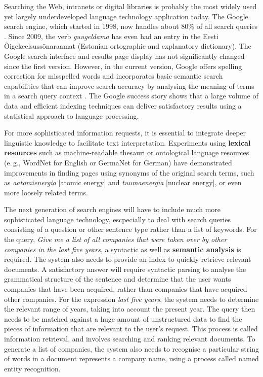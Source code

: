\begin{multicols}{2}
Searching the Web, intranets or digital libraries is probably the most widely used yet largely underdeveloped language technology application today. The Google search engine, which started in 1998, now handles about 80\% of all search queries \cite{spi1}. Since 2009, the verb \textit{guugeldama} has even had an entry in the Eesti Õigekeelsussõnaraamat (Estonian ortographic and explanatory dictionary). The Google search interface and results page display has not significantly changed since the first version. However, in the current version, Google offers spelling correction for misspelled words and incorporates basic semantic search capabilities that can improve search accuracy by analysing the meaning of terms in a search query context \cite{pc1}. The Google success story shows that a large volume of data and efficient indexing techniques can deliver satisfactory results using a statistical approach to language processing. 

For more sophisticated information requests, it is essential to integrate deeper linguistic knowledge to facilitate text interpretation. Experiments using \textbf{lexical resources} such as machine-readable thesauri or ontological language resources (e.\,g., WordNet for English or GermaNet for German) have demonstrated improvements in finding pages using synonyms of the original search terms, such as \textit{aatomienergia} {[}atomic energy{]} and \textit{tuumaenergia} {[}nuclear energy{]}, or even more loosely related terms.


The next generation of search engines will have to include much more sophisticated language technology, escpecially to deal with search queries consisting of a question or other sentence type rather than a list of keywords. For the query, \textit{Give me a list of all companies that were taken over by other companies in the last five years}, a syntactic as well as \textbf{semantic analysis} is required. The system also needs to provide an index to quickly retrieve relevant documents. A satisfactory answer will require syntactic parsing to analyse the grammatical structure of the sentence and determine that the user wants companies that have been acquired, rather than companies that have acquired other companies. For the expression \textit{last five years}, the system needs to determine the relevant range of years, taking into account the present year. The query then needs to be matched against a huge amount of unstructured data to find the pieces of information that are relevant to the user’s request. This process is called information retrieval, and involves searching and ranking relevant documents. To generate a list of companies, the system also needs to recognise a particular string of words in a document represents a company name, using a process called named entity recognition.


\end{multicols}
